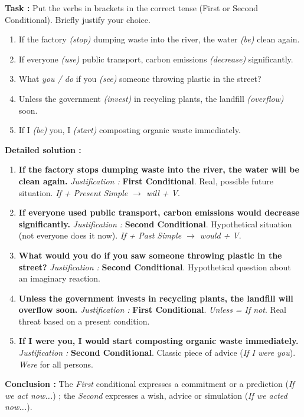 \documentclass[11pt]{article}
\newcommand{\cle}[1]{{\popxbold\color{popdark}#1}}
\begin{document}
\begin{exoresolu}
\textbf{Task :} Put the verbs in brackets in the correct tense (First or Second Conditional). Briefly justify your choice.
\begin{enumerate}
    \item If the factory \textit{(stop)} dumping waste into the river, the water \textit{(be)} clean again.
    \item If everyone \textit{(use)} public transport, carbon emissions \textit{(decrease)} significantly.
    \item What \textit{you / do} if you \textit{(see)} someone throwing plastic in the street?
    \item Unless the government \textit{(invest)} in recycling plants, the landfill \textit{(overflow)} soon.
    \item If I \textit{(be)} you, I \textit{(start)} composting organic waste immediately.
\end{enumerate}

\tcblower
\textbf{Detailed solution :}
\begin{enumerate}
    \item \textbf{If the factory \cle{stops} dumping waste into the river, the water \cle{will be} clean again.}
    \textit{Justification :} \textbf{First Conditional}. Real, possible future situation. \textit{If + Present Simple $\rightarrow$ will + V}.
    \item \textbf{If everyone \cle{used} public transport, carbon emissions \cle{would decrease} significantly.}
    \textit{Justification :} \textbf{Second Conditional}. Hypothetical situation (not everyone does it now). \textit{If + Past Simple $\rightarrow$ would + V}.
    \item \textbf{\cle{What would you do} if you \cle{saw} someone throwing plastic in the street?}
    \textit{Justification :} \textbf{Second Conditional}. Hypothetical question about an imaginary reaction.
    \item \textbf{Unless the government \cle{invests} in recycling plants, the landfill \cle{will overflow} soon.}
    \textit{Justification :} \textbf{First Conditional}. \textit{Unless = If not}. Real threat based on a present condition.
    \item \textbf{If I \cle{were} you, I \cle{would start} composting organic waste immediately.}
    \textit{Justification :} \textbf{Second Conditional}. Classic piece of advice (\textit{If I were you}). \textit{Were} for all persons.
\end{enumerate}
\textbf{Conclusion :} The \textit{First} conditional expresses a commitment or a prediction (\textit{If we act now...}) ; the \textit{Second} expresses a wish, advice or simulation (\textit{If we acted now...}).
\end{exoresolu}
\end{document}

